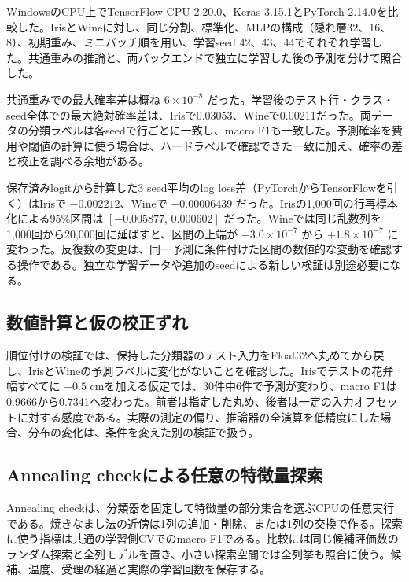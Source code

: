 WindowsのCPU上でTensorFlow CPU 2.20.0、Keras 3.15.1とPyTorch 2.14.0を比較した。IrisとWineに対し、同じ分割、標準化、MLPの構成（隠れ層32、16、8）、初期重み、ミニバッチ順を用い、学習seed 42、43、44でそれぞれ学習した。共通重みの推論と、両バックエンドで独立に学習した後の予測を分けて照合した\cite{dlcheck}。

共通重みでの最大確率差は概ね \(6\times10^{-8}\) だった。学習後のテスト行・クラス・seed全体での最大絶対確率差は、Irisで0.03053、Wineで0.00211だった。両データの分類ラベルは各seedで行ごとに一致し、macro F1も一致した。予測確率を費用や閾値の計算に使う場合は、ハードラベルで確認できた一致に加え、確率の差と校正を調べる余地がある。

保存済みlogitから計算した3 seed平均のlog loss差（PyTorchからTensorFlowを引く）はIrisで \(-0.002212\)、Wineで \(-0.00006439\) だった。Irisの1,000回の行再標本化による95\%区間は \([-0.005877,\,0.000602]\) だった。Wineでは同じ乱数列を1,000回から20,000回に延ばすと、区間の上端が \(-3.0\times10^{-7}\) から \(+1.8\times10^{-7}\) に変わった。反復数の変更は、同一予測に条件付けた区間の数値的な変動を確認する操作である。独立な学習データや追加のseedによる新しい検証は別途必要になる\cite{dlprob}。

\subsection{数値計算と仮の校正ずれ}

順位付けの検証では、保持した分類器のテスト入力をFloat32へ丸めてから戻し、IrisとWineの予測ラベルに変化がないことを確認した。Irisでテストの花弁幅すべてに \(+0.5\) cmを加える仮定では、30件中6件で予測が変わり、macro F1は0.9666から0.7341へ変わった。前者は指定した丸め、後者は一定の入力オフセットに対する感度である。実際の測定の偏り、推論器の全演算を低精度にした場合、分布の変化は、条件を変えた別の検証で扱う\cite{ranking,worklog}。

\subsection{Annealing checkによる任意の特徴量探索}

Annealing checkは、分類器を固定して特徴量の部分集合を選ぶCPUの任意実行である。焼きなまし法\cite{kirkpatrick}の近傍は1列の追加・削除、または1列の交換で作る。探索に使う指標は共通の学習側CVでのmacro F1である。比較には同じ候補評価数のランダム探索と全列モデルを置き、小さい探索空間では全列挙も照合に使う。候補、温度、受理の経過と実際の学習回数を保存する\cite{annealing}。

